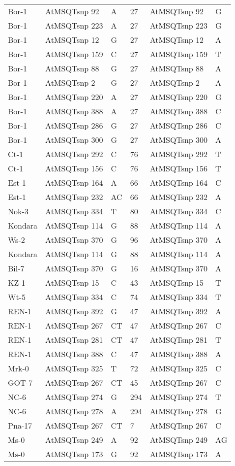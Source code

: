 \begin{center}
\begin{longtable}{|l|l|l|l|l|l|}
Bor-1&AtMSQTsnp 92&A&27&AtMSQTsnp 92&G\\
Bor-1&AtMSQTsnp 223&A&27&AtMSQTsnp 223&G\\
Bor-1&AtMSQTsnp 12&G&27&AtMSQTsnp 12&A\\
Bor-1&AtMSQTsnp 159&C&27&AtMSQTsnp 159&T\\
Bor-1&AtMSQTsnp 88&G&27&AtMSQTsnp 88&A\\
Bor-1&AtMSQTsnp 2&G&27&AtMSQTsnp 2&A\\
Bor-1&AtMSQTsnp 220&A&27&AtMSQTsnp 220&G\\
Bor-1&AtMSQTsnp 388&A&27&AtMSQTsnp 388&C\\
Bor-1&AtMSQTsnp 286&G&27&AtMSQTsnp 286&C\\
Bor-1&AtMSQTsnp 300&G&27&AtMSQTsnp 300&A\\
Ct-1&AtMSQTsnp 292&C&76&AtMSQTsnp 292&T\\
Ct-1&AtMSQTsnp 156&C&76&AtMSQTsnp 156&T\\
Est-1&AtMSQTsnp 164&A&66&AtMSQTsnp 164&C\\
Est-1&AtMSQTsnp 232&AC&66&AtMSQTsnp 232&A\\
Nok-3&AtMSQTsnp 334&T&80&AtMSQTsnp 334&C\\
Kondara&AtMSQTsnp 114&G&88&AtMSQTsnp 114&A\\
Ws-2&AtMSQTsnp 370&G&96&AtMSQTsnp 370&A\\
Kondara&AtMSQTsnp 114&G&88&AtMSQTsnp 114&A\\
Bil-7&AtMSQTsnp 370&G&16&AtMSQTsnp 370&A\\
KZ-1&AtMSQTsnp 15&C&43&AtMSQTsnp 15&T\\
Wt-5&AtMSQTsnp 334&C&74&AtMSQTsnp 334&T\\
REN-1&AtMSQTsnp 392&G&47&AtMSQTsnp 392&A\\
REN-1&AtMSQTsnp 267&CT&47&AtMSQTsnp 267&C\\
REN-1&AtMSQTsnp 281&CT&47&AtMSQTsnp 281&T\\
REN-1&AtMSQTsnp 388&C&47&AtMSQTsnp 388&A\\
Mrk-0&AtMSQTsnp 325&T&72&AtMSQTsnp 325&C\\
GOT-7&AtMSQTsnp 267&CT&45&AtMSQTsnp 267&C\\
NC-6&AtMSQTsnp 274&G&294&AtMSQTsnp 274&T\\
NC-6&AtMSQTsnp 278&A&294&AtMSQTsnp 278&G\\
Pna-17&AtMSQTsnp 267&CT&7&AtMSQTsnp 267&C\\
Ms-0&AtMSQTsnp 249&A&92&AtMSQTsnp 249&AG\\
Ms-0&AtMSQTsnp 173&G&92&AtMSQTsnp 173&A\\

\end{longtable}
\end{center}
